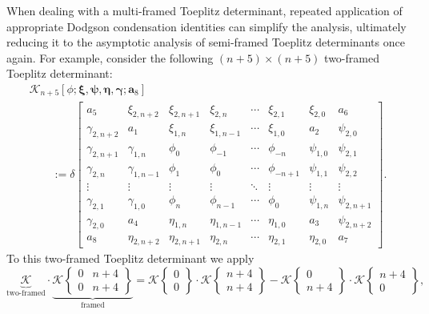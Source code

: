 \documentclass[pdftex]{sigma}
\numberwithin{equation}{section}
\newcommand{\ga}{\gamma}
\newcommand{\de}{\delta}
\begin{document}
		When dealing with a multi-framed Toeplitz determinant, repeated application of appropriate Dodgson condensation identities can simplify the analysis, ultimately reducing it to the asymptotic analysis of semi-framed Toeplitz determinants once again. For example, consider the following $(n+5) \times (n+5)$ two-framed Toeplitz determinant:
		\begin{gather}
			\mathscr{K}_{n+5}[\phi; \boldsymbol{\xi}, \boldsymbol{\psi}, \boldsymbol{\eta}, \boldsymbol{\ga}; \boldsymbol{a}_8]\nonumber\\
\qquad := \de\begin{bmatrix}
				a_5 & \xi_{2,n+2} & \xi_{2,n+1} & \xi_{2,n} & \cdots & \xi_{2,1} & \xi_{2,0} & a_6 \\
				\ga_{2,n+2} &	a_1 & \xi_{1,n} & \xi_{1,n-1} & \cdots & \xi_{1,0} & a_2 & \psi_{2,0} \\
				\ga_{2,n+1} &	\ga_{1,n} &	\phi_0& \phi_{-1} & \cdots & \phi_{-n} & \psi_{1,0} & \psi_{2,1} \\
				\ga_{2,n} &	\ga_{1,n-1} &	\phi_{1}& \phi_0 & \cdots & \phi_{-n+1} & \psi_{1,1} & \psi_{2,2} \\
				\vdots &	\vdots & \vdots & \vdots & \ddots & \vdots & \vdots & \vdots \\
				\ga_{2,1} &	\ga_{1,0} &	\phi_{n} & \phi_{n-1} & \cdots & \phi_{0} & \psi_{1,n} & \psi_{2,n+1} \\
				\ga_{2,0} &	a_4 &	\eta_{1,n} & \eta_{1,n-1} & \cdots & \eta_{1,0} & a_3 & \psi_{2,n+2} \\
				a_8 &	\eta_{2,n+2} &	\eta_{2,n+1} & \eta_{2,n} & \cdots & \eta_{2,1} & \eta_{2,0} & a_7
			\end{bmatrix}.\label{two framed}
		\end{gather}
		To this two-framed Toeplitz determinant we apply
		\begin{equation}\label{DODGSON framed C} \underbrace{\mathscr{K}}_{\text{two-framed}}
			\cdot \underbrace{ \mathscr{K}\left\lbrace \begin{matrix} 0 & n+4 \\ 0 & n+4 \end{matrix} \right\rbrace }_{\text{framed}} = \mathscr{K}\left\lbrace \begin{matrix} 0 \\ 0 \end{matrix} \right\rbrace \cdot \mathscr{K}\left\lbrace \begin{matrix} n+4 \\ n+4 \end{matrix} \right\rbrace - \mathscr{K}\left\lbrace \begin{matrix} 0 \\ n+4 \end{matrix} \right\rbrace \cdot \mathscr{K}\left\lbrace \begin{matrix} n+4 \\ 0 \end{matrix} \right\rbrace,
		\end{equation}
\end{document}
